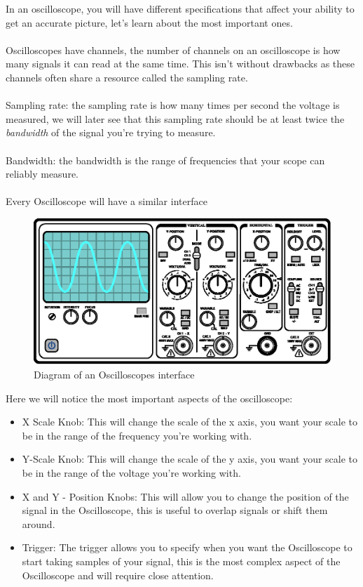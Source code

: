 \documentclass{article}
\begin{document}
In an oscilloscope, you will have different specifications that affect your ability to get an accurate picture, let's learn about the most important ones.
\\
\
\\
Oscilloscopes have channels, the number of channels on an oscilloscope is how many signals it can read at the same time. This isn't without drawbacks as these channels often share a resource called the sampling rate.
\\
\ 
\\
Sampling rate: the sampling rate is how many times per second the voltage is measured, we will later see that this sampling rate should be at least twice the \emph{bandwidth} of the signal you're trying to measure.
\\
\ 
\\
Bandwidth: the bandwidth is the range of frequencies that your scope can reliably measure.
\\
\
\\
Every Oscilloscope will have a similar interface
\begin{figure}[!phbt]
    \centering
    \includegraphics[width=0.85\linewidth]{img/oscilloscope.eps}
    \caption{Diagram of an Oscilloscopes interface}
    \label{fig:oscilloscope}
\end{figure}

Here we will notice the most important aspects of the oscilloscope:
\begin{itemize}
    \item X Scale Knob: This will change the scale of the x axis, you want your scale to be in the range of the frequency you're working with.
    \item Y-Scale Knob: This will change the scale of the y axis, you want your scale to be in the range of the voltage you're working with.
    \item X and Y - Position Knobs: This will allow you to change the position of the signal in the Oscilloscope, this is useful to overlap signals or shift them around.
    \item Trigger: The trigger allows you to specify when you want the Oscilloscope to start taking samples of your signal, this is the most complex aspect of the Oscilloscope and will require close attention.
\end{itemize}
\end{document}
